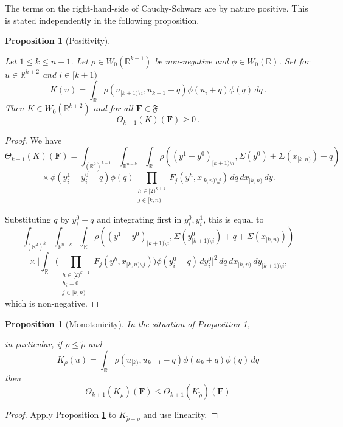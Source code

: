 \documentclass[12pt,reqno]{amsart}
\theoremstyle{plain}
\newtheorem{proposition}[theorem]{Proposition}
\numberwithin{equation}{section}
\theoremstyle{remark}
\newcommand{\uses}[1]{}
\newcommand{\usesdefs}[1]{}
\newcommand{\leanok}{}
\newcommand{\lean}[1]{}
\newcommand{\R}{{\mathbb R}}
\newcommand{\F}{\mathbf{F}}
\begin{document}
The terms on the right-hand-side of Cauchy-Schwarz are by nature positive. This is
stated independently in the following proposition.
\begin{proposition}[Positivity]\label{Positivity K}\uses{}\usesdefs{auto:Wiener-space-definition,normalized function tuples,prism Brascamp--Lieb}
\lean{Auto.positivityKernel_memW0,Auto.positivityKernel_nonnegative}
\leanok
 Let $1\le k\le n-1$. Let $\rho\in W_0(\R^{k+1})$ be non-negative and
$\phi\in W_0(\R)$. Set for $u\in\R^{k+2}$ and $i\in [k+1)$
\begin{equation}\label{auto:positive-kernel-K}
    K(u)=\int_\R \rho(u_{[k+1)\setminus i}, u_{k+1}-q) \phi(u_{i}+q) \phi(q) \, dq\, .
\end{equation}
Then $K\in W_0(\R^{k+2})$ and for all $\mathbf{F}\in\mathfrak{F}$
\begin{equation}\label{auto:positive-K-form}
    \Theta_{k+1}(K)(\F)\ge 0\, .
\end{equation}
\end{proposition}

\begin{proof}
We have
\[
\Theta_{k+1}(K)(\F)
= \int_{(\R^2)^{k+1}}\int_{\R^{n-k}}\int_\R
\rho((y^1-y^0)_{[k+1)\setminus i},\Sigma(y^0)+\Sigma(x_{[k,n)})-q)
\]
\[
{}\times
\phi(y_i^1-y_i^0+q)\phi(q)
\prod_{\substack{h\in [2)^{k+1}\\j\in[k,n)}}
F_j(y^h,x_{[k,n)\setminus j})
\,dq\,dx_{[k,n)}\,dy .
\]

Substituting \(q\) by \(y_i^0-q\) and integrating first in \(y_i^0,y_i^1\), this is equal to
\[
\int_{(\R^2)^{k}}\int_{\R^{n-k}}\int_\R
\rho((y^1-y^0)_{[k+1)\setminus i},
\Sigma(y^0_{[k+1)\setminus i})+q+\Sigma(x_{[k,n)}))
\]
\[
{}\times
\Big|
\int_\R
\Big(
\prod_{\substack{h\in [2)^{k+1}\\ h_i=0\\ j\in[k,n)}}
F_j(y^h,x_{[k,n)\setminus j})
\Big)
\phi(y_i^0-q)\,dy_i^0
\Big|^2
\,dq\,dx_{[k,n)}\,dy_{[k+1)\setminus i},
\]
which is non-negative.
\end{proof}


\begin{proposition}[Monotonicity]\label{Monotonicity K}\uses{Positivity K}\usesdefs{auto:Wiener-space-definition,normalized function tuples,prism Brascamp--Lieb}In the situation of Proposition \ref{Positivity K},
\lean{Auto.monotonicityK}
\leanok
in particular, if $\rho\le \tilde{\rho}$ and
\begin{equation}\label{auto:kernel-monotonicity-K-rho} K_\rho(u)=\int_\R \rho(u_{[k)}, u_{k+1}-q) \phi(u_{k}+q) \phi(q) \, dq\end{equation}
then
\begin{equation}\label{auto:kernel-monotonicity-bound} \Theta_{k+1}(K_\rho)(\F) \le \Theta_{k+1}(K_{\tilde{\rho}})(\F) \end{equation}
\end{proposition}
\begin{proof}
    Apply Proposition \ref{Positivity K} to $K_{\tilde{\rho}-\rho}$ and use linearity.
\end{proof}
\end{document}
